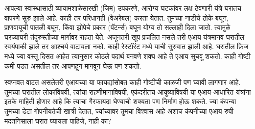 आपल्या स्वास्थासाठी व्यायामशाळेसारखी (जिम) उपकरणे, आरोग्य घटकांवर लक्ष ठेवणारी यंत्रे घरातच वापरणे सुरु झाले आहे. काही तर परिधानही (वेअरेबल) करता येतात. तुमच्या नाडीचे ठोके बघून, प्राणवायूची पातळी बघून, किंवा झोपेचे प्रकार (पॅटर्न्स) बघून योग्य तो सल्लाही दिला जातो. त्यामुळे घरच्याघरी तंदुरुस्तीच्या मार्गावर राहता येते. अजूनतरी खूप प्रचलित नसले तरी एआय-यंत्रमानव घरातील स्वयंपाकी झाले तर आश्चर्य वाटायला नको. काही रेस्टॉरंट मध्ये याची सुरुवात झाली आहे. घरातील फ्रिज मध्ये ज्या वस्तू दिसत आहेत त्यानुसार कोठले पदार्थ बनवणे शक्य आहे ते एआय सुचवू शकतो. काही गोष्टी कमी पडत असतील तर आपणहून मागवून घेऊ पण शकतो.

स्वप्नवत वाटत असलेतरी एआयच्या या फायद्यांसोबत काही गोष्टींची काळजी पण घ्यावी लागणार आहे. तुमच्या घरातील लोकांविषयी, त्यांचा राहणीमानाविषयी, एकंदरीतच आयुष्याविषयी या एआय-आधारित यंत्रांना इतके माहिती होणार आहे कि त्याचा गैरफायदा घेण्याची शक्यता पण निर्माण होऊ शकते. ज्या कंपन्या तुमच्या डेटा गोपनीयतेची खात्री देतात, ज्यांच्यावर तुमचा विश्वास आहे अशाच कंपनीच्या एआय रुपी मदतनिसाला घरात घ्यायला पाहिजे, नाही का?